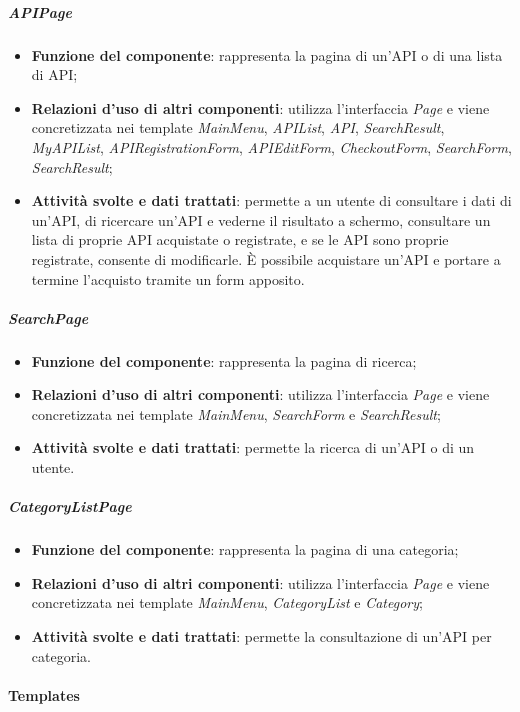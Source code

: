 \subparagraph{APIPage}
\begin{itemize}
	\item \textbf{Funzione del componente}: rappresenta la pagina di un'API o di una lista di API;
	\item \textbf{Relazioni d'uso di altri componenti}: utilizza l'interfaccia \textit{Page} e viene concretizzata nei template \textit{MainMenu}, \textit{APIList}, \textit{API}, \textit{SearchResult}, \textit{MyAPIList}, \textit{APIRegistrationForm}, \textit{APIEditForm}, \textit{CheckoutForm}, \textit{SearchForm}, \textit{SearchResult};
	\item \textbf{Attività svolte e dati trattati}: permette a un utente di consultare i dati di un'API, di ricercare un'API e vederne il risultato a schermo, consultare un lista di proprie API acquistate o registrate, e se le API sono proprie registrate, consente di modificarle. \MakeUppercase{è} possibile acquistare un'API e portare a termine l'acquisto tramite un form apposito.
\end{itemize}

\subparagraph{SearchPage}
\begin{itemize}
	\item \textbf{Funzione del componente}: rappresenta la pagina di ricerca;
	\item \textbf{Relazioni d'uso di altri componenti}: utilizza l'interfaccia \textit{Page} e viene concretizzata nei template \textit{MainMenu}, \textit{SearchForm} e \textit{SearchResult};
	\item \textbf{Attività svolte e dati trattati}: permette la ricerca di un'API o di un utente.	
\end{itemize}

\subparagraph{CategoryListPage}
\begin{itemize}
	\item \textbf{Funzione del componente}: rappresenta la pagina di una categoria;
	\item \textbf{Relazioni d'uso di altri componenti}: utilizza l'interfaccia \textit{Page} e viene concretizzata nei template \textit{MainMenu}, \textit{CategoryList} e \textit{Category};
	\item \textbf{Attività svolte e dati trattati}: permette la consultazione di un'API per categoria.
\end{itemize}


\paragraph{Templates}

